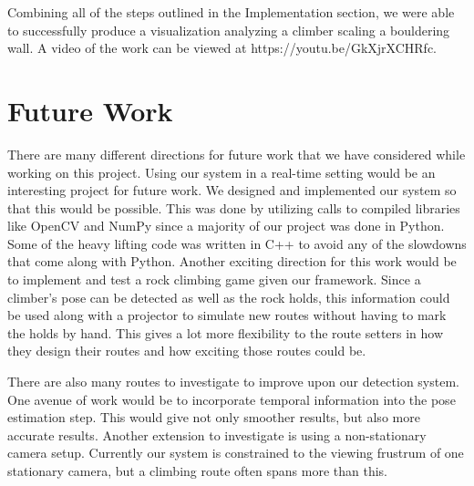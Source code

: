 \documentclass{chi2009}
\begin{document}
Combining all of the steps outlined in the Implementation section, we were able to successfully produce a visualization analyzing a climber scaling a bouldering wall. A video of the work can be viewed at https://youtu.be/GkXjrXCHRfc.

\section{Future Work}

There are many different directions for future work that we have considered while working on this project. Using our system in a real-time setting would be an interesting project for future work. We designed and implemented our system so that this would be possible. This was done by utilizing calls to compiled libraries like OpenCV and NumPy since a majority of our project was done in Python. Some of the heavy lifting code was written in C++ to avoid any of the slowdowns that come along with Python. Another exciting direction for this work would be to implement and test a rock climbing game given our framework. Since a climber's pose can be detected as well as the rock holds, this information could be used along with a projector to simulate new routes without having to mark the holds by hand. This gives a lot more flexibility to the route setters in how they design their routes and how exciting those routes could be.

There are also many routes to investigate to improve upon our detection system. One avenue of work would be to incorporate temporal information into the pose estimation step. This would give not only smoother results, but also more accurate results. Another extension to investigate is using a non-stationary camera setup. Currently our system is constrained to the viewing frustrum of one stationary camera, but a climbing route often spans more than this.
\end{document}
